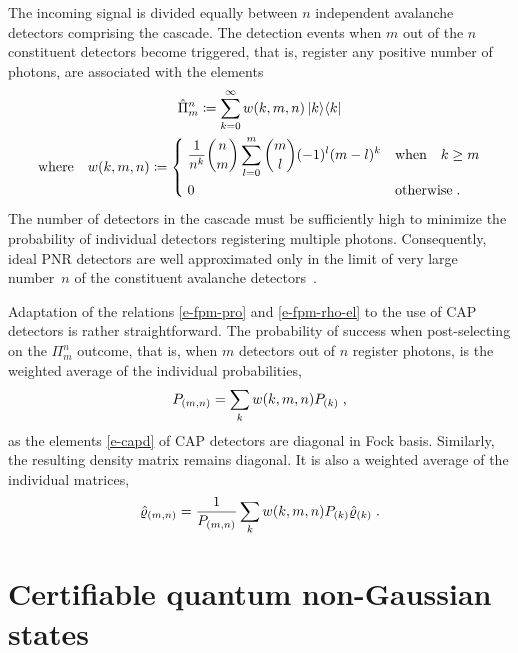 \documentclass{article}
\begin{document}
The incoming signal is divided equally between $n$ independent avalanche detectors comprising the cascade. The detection events when $m$ out of the $n$ constituent detectors become triggered, that is, register any positive number of photons, are associated with the elements~\cite{paul1996}
%
\begin{equation}\label{e-capd}
  \begin{gathered}
  \hat{\Pi}_{m}^{n} 
    \coloneqq \sum_{k = 0}^{\infty} w(k, m, n) \ketbra{k}{k} \\
  \text{where} \quad
  w(k, m, n) 
    \coloneqq 
    \begin{dcases}
      \; \frac{1}{n^{k}} \binom{n}{m} \sum_{l = 0}^{m} \binom{m}{l} (-1)^{l} (m - l)^{k} 
      & \text{when}\quad k \geq m \\
      \; 0 & \text{otherwise} \Qd
    \end{dcases}
  \end{gathered}
\end{equation} 
%
The number of detectors in the cascade must be sufficiently high to minimize the probability of individual detectors registering multiple photons. Consequently, ideal PNR detectors are well approximated only in the limit of very large number~$n$ of the constituent avalanche detectors~\cite{provaznik2020}.

Adaptation of the relations \eqref{e-fpm-pro} and \eqref{e-fpm-rho-el} to the use of CAP detectors is rather straightforward. The probability of success when post-selecting on the $\Pi_{m}^{n}$ outcome, that is, when $m$ detectors out of $n$ register photons, is the weighted average of the individual probabilities,
%
\begin{equation}
  P_{(m, n)} = \sum_{k} w(k, m, n) P_{(k)} \;\text{,}
\end{equation}
%
as the elements \eqref{e-capd} of CAP detectors are diagonal in Fock basis. Similarly, the resulting density matrix remains diagonal. It is also a weighted average of the individual matrices,
\begin{equation}
  \hat{\varrho}_{(m, n)} =
    \frac{1}{P_{(m, n)}}
    \sum_{k} w(k, m, n) 
      P_{(k)} \hat{\varrho}_{(k)}
  \;\text{.}
\end{equation}

%
%

\section{Certifiable quantum non-Gaussian states}
\end{document}
